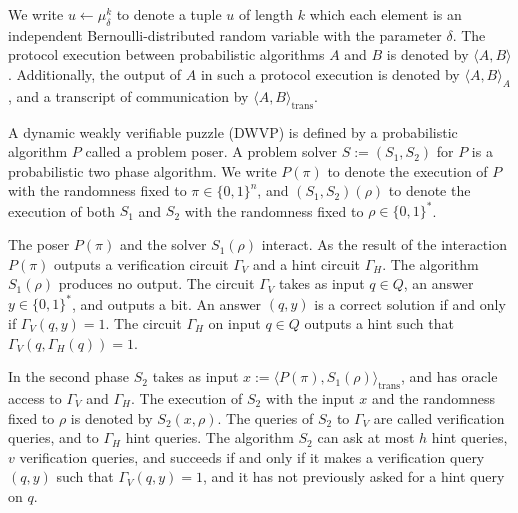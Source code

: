 %
%
\noindent
We write $u \leftarrow \mu_{\delta}^k$ to denote a tuple $u$ of length $k$ which each element
is an independent Bernoulli-distributed random variable with the parameter $\delta$.
The protocol execution between probabilistic algorithms $A$ and $B$ is denoted by $\langle A, B \rangle$.
Additionally, the output of $A$ in such a protocol execution is denoted by $\langle A, B \rangle_A$, and a transcript
of communication by $\langle A, B \rangle_{\text{trans}}$.
%
\begin{definition}
  \label{def:dwvp}
  A dynamic weakly verifiable puzzle (DWVP) is defined by a probabilistic algorithm $P$
  called a problem poser.
  A problem solver $S := (S_1, S_2)$ for $P$ is a probabilistic two phase algorithm.
  We write $P(\pi)$ to denote the execution of $P$ with the randomness fixed to $\pi \in \{0,1\}^n$, and $(S_1,S_2)(\rho)$
  to denote the execution of both $S_1$ and $S_2$ with the randomness fixed to $\rho \in \{0,1\}^{*}$.

  The poser $P(\pi)$ and the solver $S_1(\rho)$ interact.
  As the result of the interaction $P(\pi)$ outputs a verification circuit $\Gamma_{V}$ and a hint circuit $\Gamma_{H}$.
  The algorithm $S_1(\rho)$ produces no output.
  The circuit $\Gamma_{V}$ takes as input $q \in Q$, an answer $y \in \{0,1\}^*$,
  and outputs a bit. An answer $(q,y)$ is a correct solution if and only if $\Gamma_V(q,y) = 1$.
  The circuit $\Gamma_H$ on input $q \in Q$ outputs a hint such that $\Gamma_V(q,\Gamma_H(q)) = 1$.

  In the second phase $S_2$ takes as input $x := \langle P(\pi), S_1(\rho) \rangle_{\text{trans}}$,
  and has oracle access to $\Gamma_V$ and $\Gamma_H$.
  The execution of $S_2$ with the input $x$ and the randomness fixed to $\rho$
  is denoted by $S_2(x, \rho)$. The queries of $S_2$ to $\Gamma_V$ are called verification queries, and to $\Gamma_H$ hint queries.
  The algorithm $S_2$ can ask at most $h$ hint queries, $v$ verification queries, and succeeds if and only if
  it makes a verification query $(q,y)$ such that $\Gamma_V(q,y) = 1$, and it has not previously asked for a hint query on $q$.
\end{definition}
%
